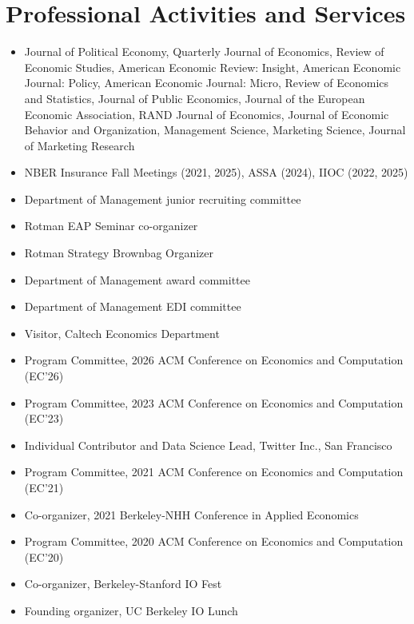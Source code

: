 \section*{Professional Activities and Services}
\begin{itemize}
\item[Referee] Journal of Political Economy, Quarterly Journal of Economics, Review of Economic Studies, American Economic Review: Insight, American Economic Journal: Policy, American Economic Journal: Micro, Review of Economics and Statistics, Journal of Public Economics, Journal of the European Economic Association, RAND Journal of Economics, Journal of Economic Behavior and Organization, Management Science, Marketing Science, Journal of Marketing Research
\item[Discussant] NBER Insurance Fall Meetings (2021, 2025), ASSA (2024), IIOC (2022, 2025)
\item[2022-] Department of Management junior recruiting committee
\item[2022-] Rotman EAP Seminar co-organizer
\item[2023] Rotman Strategy Brownbag Organizer
\item[2023-] Department of Management award committee
\item[2024] Department of Management EDI committee
\item[2024] Visitor, Caltech Economics Department
\item[2026] Program Committee, 2026 ACM Conference on Economics and Computation (EC'26)
\item[2023] Program Committee, 2023 ACM Conference on Economics and Computation (EC'23)
\item[2021] Individual Contributor and Data Science Lead, Twitter Inc., San Francisco
\item[2021] Program Committee, 2021 ACM Conference on Economics and Computation (EC'21)
\item[2021] Co-organizer, 2021 Berkeley-NHH Conference in Applied Economics
\item[2020] Program Committee, 2020 ACM Conference on Economics and Computation (EC'20)
\item[2019] Co-organizer, Berkeley-Stanford IO Fest
\item[2019] Founding organizer, UC Berkeley IO Lunch

\end{itemize}
